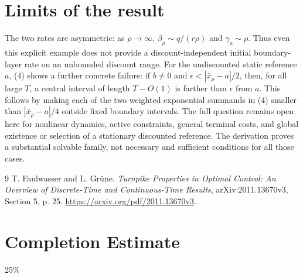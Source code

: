 \documentclass[11pt]{article}
\theoremstyle{definition}
\begin{document}
\section*{Limits of the result}
The two rates are asymmetric: as $\rho\to\infty$,
$\beta_\rho\sim q/(r\rho)$ and $\gamma_\rho\sim\rho$.
Thus even this explicit example does not provide a discount-independent
initial boundary-layer rate on an unbounded discount range.
For the undiscounted static reference $a$, (4) shows a further concrete
failure: if $b\ne0$ and $\epsilon<|\bar x_\rho-a|/2$, then, for all
large $T$, a central interval of length $T-O(1)$ is farther than
$\epsilon$ from $a$. This follows by making each of the two weighted exponential summands in (4)
smaller than $|\bar x_\rho-a|/4$ outside fixed boundary intervals.
The full question remains open here for nonlinear dynamics, active
constraints, general terminal costs, and global existence or selection of
a stationary discounted reference. The derivation proves a substantial
solvable family, not necessary and sufficient conditions for all those cases.

\begin{thebibliography}{9}
 T. Faulwasser and L. Gr\"une.
\emph{Turnpike Properties in Optimal Control: An Overview of Discrete-Time and Continuous-Time Results}, arXiv:2011.13670v3, Section 5, p. 25.
\url{https://arxiv.org/pdf/2011.13670v3}.
\end{thebibliography}
\section{Completion Estimate}
25\%
\end{document}
